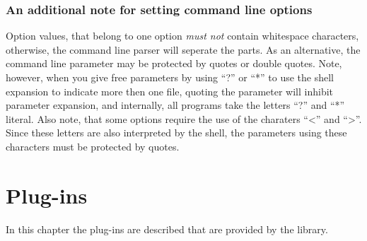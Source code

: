 \documentclass[english, 10pt, a4paper,headsepline,openany]{scrbook}
\begin{document}
\subsection*{An additional note for setting command line options}

Option values, that belong to one option \emph{must not} contain whitespace characters, otherwise, 
  the command line parser will seperate the parts. 
As an alternative, the command line parameter may be protected by quotes or double quotes. 
Note, however, when you give free parameters by using ``?'' or ``*'' to use the shell expansion to indicate 
  more then one file, quoting the parameter will inhibit parameter expansion, and internally, all programs 
  take the letters ``?'' and ``*'' literal. 
Also note, that some options require the use of the charaters ``<'' and ``>''. 
Since these letters are also interpreted by the shell, the parameters using these characters must be 
  protected by quotes. 



\chapter{Plug-ins}
\label{ch:plugins}

In this chapter the plug-ins are described that are provided by the library.



\cleardoublepage{}

\end{document}
